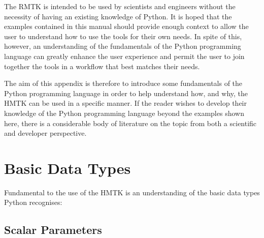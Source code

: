 The RMTK is intended to be used by scientists and engineers without the necessity of having an existing knowledge of Python. It is hoped that the examples contained in this manual should provide enough context to allow the user to understand how to use the tools for their own needs. In spite of this, however, an understanding of the fundamentals of the Python programming language can greatly enhance the user experience and permit the user to join together the tools in a workflow that best matches their needs.

The aim of this appendix is therefore to introduce some fundamentals of the Python programming language in order to help understand how, and why, the HMTK can be used in a specific manner. If the reader wishes to develop their knowledge of the Python programming language beyond the examples shown here, there is a considerable body of literature on the topic from both a scientific and developer perspective.

\section{Basic Data Types}

Fundamental to the use of the HMTK is an understanding of the basic data types Python recognises:


\subsection{Scalar Parameters}

